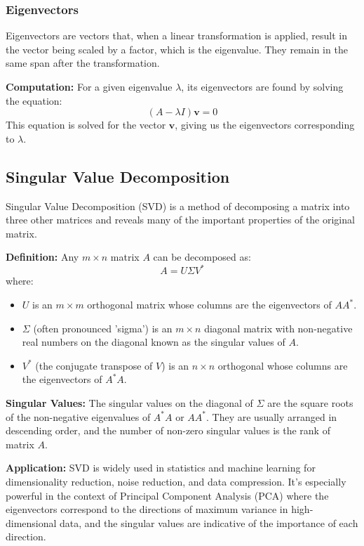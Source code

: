 \documentclass{article}
\begin{document}
	\subsubsection{Eigenvectors}
	Eigenvectors are vectors that, when a linear transformation is applied, result in the vector being scaled by a factor, which is the eigenvalue. They remain in the same span after the transformation.
	
	\textbf{Computation:}
	For a given eigenvalue \( \lambda \), its eigenvectors are found by solving the equation:
	\[
	(A - \lambda I)\mathbf{v} = 0
	\]
	This equation is solved for the vector \( \mathbf{v} \), giving us the eigenvectors corresponding to \( \lambda \).
	
	\subsection{Singular Value Decomposition}
	Singular Value Decomposition (SVD) is a method of decomposing a matrix into three other matrices and reveals many of the important properties of the original matrix.
	
	\textbf{Definition:}
	Any \( m \times n \) matrix \( A \) can be decomposed as:
	\[
	A = U\Sigma V^*
	\]
	where:
	\begin{itemize}
		\item \( U \) is an \( m \times m \) orthogonal matrix whose columns are the eigenvectors of \( AA^* \).
		\item \( \Sigma \) (often pronounced 'sigma') is an \( m \times n \) diagonal matrix with non-negative real numbers on the diagonal known as the singular values of \( A \).
		\item \( V^* \) (the conjugate transpose of \( V \)) is an \( n \times n \) orthogonal whose columns are the eigenvectors of \( A^*A \).
	\end{itemize}
	
	\textbf{Singular Values:}
	The singular values on the diagonal of \( \Sigma \) are the square roots of the non-negative eigenvalues of \( A^*A \) or \( AA^* \). They are usually arranged in descending order, and the number of non-zero singular values is the rank of matrix \( A \).
	
	\textbf{Application:}
	SVD is widely used in statistics and machine learning for dimensionality reduction, noise reduction, and data compression. It's especially powerful in the context of Principal Component Analysis (PCA) where the eigenvectors correspond to the directions of maximum variance in high-dimensional data, and the singular values are indicative of the importance of each direction.
	
\end{document}
